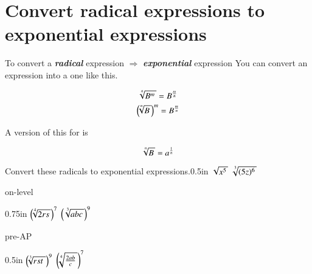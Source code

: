 \section*{Convert radical expressions to exponential expressions}

\begin{myConcept}{%
        To convert 
        a {\bfseries\itshape radical} expression 
        $\Longrightarrow$
        {\bfseries\itshape exponential} expression
    }%
    You can convert an  expression into a  one like this.
    \begin{myCenteredBox}[width=3in]
        \Large
        \[
            \myRoot[n]{B^m}
            =
            B ^ {\frac{m}{n}}
        \]
        \[
            \left(\hspace{-0.25em} \myRoot[n]{B} \right)^m
            =
            B ^ {\frac{m}{n}}
        \]
    \end{myCenteredBox}
    A version of this for  is
    \begin{myCenteredBox}[width=3in]
        \Large
        \[
            \myRoot[n]{B}
            =
            a ^ {\frac{1}{n}}
        \]
    \end{myCenteredBox}
\end{myConcept}




\begin{myProblems2}{Convert these radicals to exponential expressions.}{0.5in}
    {
        $\myRoot{x^5}$ 
    }
    {
        $\myRoot[3]{(5z)^6}$ 
    }
\end{myProblems2}




\begin{taggedblock}{on-level}
    \begin{myProblems2}{}{0.75in}
        {
            $\left(\hspace{-0.25em}   \myRoot[4]{2rs}   \right)^7$ 
        }
        {
            $\left( \myRoot[3]{abc} \right)^9$ 
        }
    \end{myProblems2}
\end{taggedblock}
\begin{taggedblock}{pre-AP}
    \begin{myProblems2}{}{0.5in}
        {
            $\left(\hspace{-0.25em}   \myRoot[3]{rst\,}   \right)^9$ 
        }
        {
            $\left(\hspace{-0.25em}   \myRoot[4]{\frac{2ab}{c}}   \right)^7$ 
        }
    \end{myProblems2}
\end{taggedblock}




